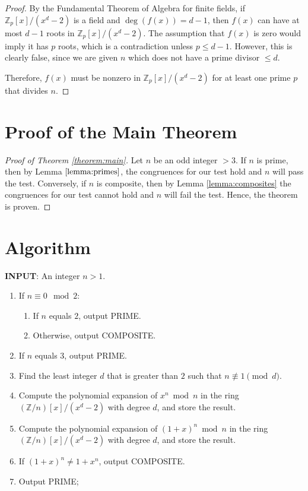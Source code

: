 \documentclass{article}
\theoremstyle{plain}
\theoremstyle{definition}
\newcommand{\Z}{\mathbb{Z}}
\newcommand{\Zn}{\Z/n}
\begin{document}
\begin{proof}
By the Fundamental Theorem of Algebra for finite fields, if $\mathbb{Z}_p[x]/(x^d - 2)$ is a field and $\deg(f(x)) = d-1$, then $f(x)$ can have at most $d-1$ roots in $\mathbb{Z}_p[x]/(x^d - 2)$. The assumption that $f(x)$ is zero would imply it has $p$ roots, which is a contradiction unless $p \leq d-1$. However, this is clearly false, since we are given $n$ which does not have a prime divisor $\leq d$.

Therefore, $f(x)$ must be nonzero in $\mathbb{Z}_p[x]/(x^d - 2)$ for at least one prime $p$ that divides $n$.
\end{proof}

\section{Proof of the Main Theorem}
\begin{proof}[Proof of Theorem \ref{theorem:main}]
Let \( n \) be an odd integer $>3$. If $n$ is prime, then by Lemma $\ref{lemma:primes}$, the congruences for our test hold and $n$ will pass the test. Conversely, if $n$ is composite, then by Lemma \ref{lemma:composites} the congruences for our test cannot hold and $n$ will fail the test. Hence, the theorem is proven.
\end{proof}

\section{Algorithm} \label{section:algorithm}
\textbf{INPUT}: An integer $n > 1$.
\begin{center}
    \begin{enumerate}
        \item If $n \equiv 0 \mod{2}$:
            \begin{enumerate}
                \item If $n$ equals $2$, output PRIME.
                \item Otherwise, output COMPOSITE.
            \end{enumerate}
        \item If $n$ equals $3$, output PRIME.
        \item Find the least integer $d$ that is greater than $2$ such that $n \not\equiv 1 \pmod{d}$.
        \item Compute the polynomial expansion of $x^n \bmod{n}$ in the ring $(\Zn)[x]/(x^d-2)$ with degree $d$, and store the result.
        \item Compute the polynomial expansion of $(1 + x)^n \bmod{n}$ in the ring $(\Zn)[x]/(x^d-2)$ with degree $d$, and store the result.
        \item If $(1 + x)^n \not= 1 + x^n$, output COMPOSITE.
        \item Output PRIME;
    \end{enumerate}
\end{center}
\end{document}
